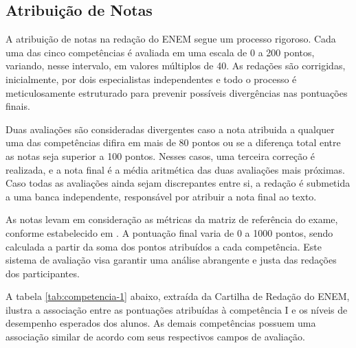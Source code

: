 \subsection{Atribuição de Notas}

A atribuição de notas na redação do ENEM segue um processo rigoroso. Cada uma das cinco competências é avaliada em uma escala de 0 a 200 pontos, variando, nesse intervalo, em valores múltiplos de 40. As redações são corrigidas, inicialmente, por dois especialistas independentes e todo o processo é meticulosamente estruturado para prevenir possíveis divergências nas pontuações finais.

Duas avaliações são consideradas divergentes caso a nota atribuida a qualquer uma das competências difira em mais de 80 pontos ou se a diferença total entre as notas seja superior a 100 pontos. Nesses casos, uma terceira correção é realizada, e a nota final é a média aritmética das duas avaliações mais próximas. Caso todas as avaliações ainda sejam discrepantes entre si, a redação é submetida a uma banca independente, responsável por atribuir a nota final ao texto.

As notas levam em consideração as métricas da matriz de referência do exame, conforme estabelecido em \cite[p.~9-22]{cartilha-redacao}. A pontuação final varia de 0 a 1000 pontos, sendo calculada a partir da soma dos pontos atribuídos a cada competência. Este sistema de avaliação visa garantir uma análise abrangente e justa das redações dos participantes.

A tabela \ref{tab:competencia-1} abaixo, extraída da Cartilha de Redação do ENEM, ilustra a associação entre as pontuações atribuídas à competência I e os níveis de desempenho esperados dos alunos. As demais competências possuem uma associação similar de acordo com seus respectivos campos de avaliação.

